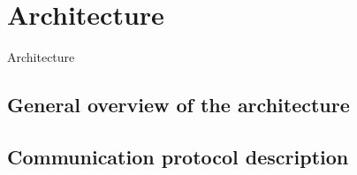 \chapter{Architecture}
\label{Architecture}

Architecture

\section{General overview of the architecture}
\section{Communication protocol description}